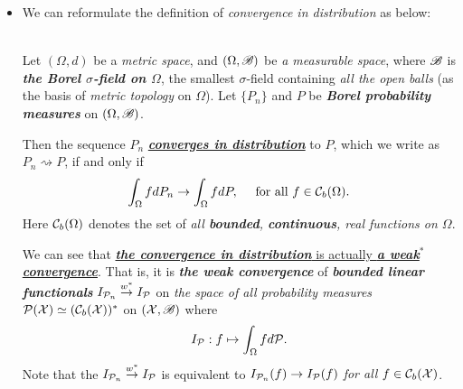 \documentclass[11pt]{article}
\begin{document}
\begin{itemize}
\item We can reformulate the definition of \emph{convergence in distribution} as below:
\begin{definition} \citep{wellner2013weak}\\
Let $(\Omega, d)$ be a \emph{metric space}, and $(\Omega, {\mathscr B})$ be \emph{a measurable space}, where ${\mathscr B}$ is \emph{\textbf{the Borel $\sigma$-field on $\Omega$}}, the smallest $\sigma$-field containing \emph{all the open balls} (as the basis of \emph{metric topology} on $\Omega$). Let $\{P_n \}$ and $P$ be \emph{\textbf{Borel probability measures}} on $(\Omega, {\mathscr B})$.

Then the sequence $P_n$ \underline{\emph{\textbf{converges in distribution}}} to $P$, which we write as $P_n \rightsquigarrow P$, if and only if
\begin{align*}
\int_{\Omega} f dP_n \rightarrow \int_{\Omega} f dP, \quad \text{ for all } f \in {\mathcal C}_{b}(\Omega).
\end{align*}
Here ${\mathcal C}_{b}(\Omega)$ denotes the set of \emph{all \textbf{bounded}, \textbf{continuous}, real functions on $\Omega$}.
\end{definition} 
We can see that \underline{\emph{\textbf{the convergence in distribution}} is actually \emph{\textbf{a weak$^{*}$ convergence}}}. That is, it is \emph{\textbf{the weak convergence}} of  \emph{\textbf{bounded linear functionals}} $I_{{\mathcal P}_n} \stackrel{w^{*}}{\rightarrow} I_{{\mathcal P}}$ on \emph{the space of all probability measures} ${\mathcal P}({\mathcal X}) \simeq ({\mathcal C}_{b}({\mathcal X}))^{*}$ on $({\mathcal X}, {\mathscr B})$ where 
\begin{align*}
I_{{\mathcal P}}: f \mapsto \int_{\Omega} f d{\mathcal P}.
\end{align*} Note that the $I_{{\mathcal P}_n} \stackrel{w^{*}}{\rightarrow} I_{{\mathcal P}}$ is equivalent to $I_{{\mathcal P}_n}(f) \rightarrow I_{{\mathcal P}}(f)$ \emph{for all $f \in  {\mathcal C}_{b}({\mathcal X})$}.
\end{itemize}


\newpage


\end{document}
